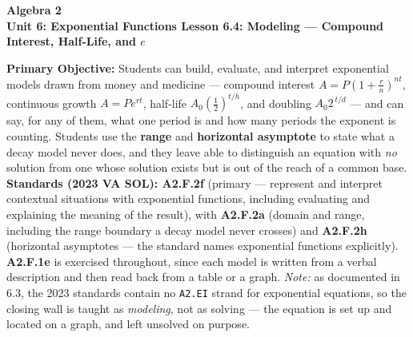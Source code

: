 \documentclass[10pt]{article}
\newcommand{\CourseName}{Algebra 2}
\newcommand{\UnitNumberName}{Unit 6: Exponential Functions \quad}
\newcommand{\LessonNumberName}{Lesson 6.4: Modeling --- Compound Interest, Half-Life, and $e$}
\begin{document}
\begin{center}
    {\Large\bfseries \CourseName \\
    {\small\bfseries \UnitNumberName \LessonNumberName}}
\end{center}

\begin{tcolorbox}[colback=forestbg, colframe=forest, boxrule=0.9pt, arc=2mm,
    left=2mm, right=2mm, top=1.5mm, bottom=1.5mm]
    \textbf{Primary Objective:} Students can build, evaluate, and interpret exponential models drawn
    from money and medicine --- compound interest $A=P\left(1+\frac{r}{n}\right)^{nt}$, continuous
    growth $A=Pe^{rt}$, half-life $A_{0}\left(\frac12\right)^{t/h}$, and doubling
    $A_{0}2^{\,t/d}$ --- and can say, for any of them, what one period is and how many periods the
    exponent is counting. Students use the \textbf{range} and \textbf{horizontal asymptote} to state
    what a decay model never does, and they leave able to distinguish an equation with \emph{no}
    solution from one whose solution exists but is out of the reach of a common base.
    \\[2pt]
    \textbf{Standards (2023 VA SOL): A2.F.2f} (primary --- represent and interpret contextual
    situations with exponential functions, including evaluating and explaining the meaning of the
    result), with \textbf{A2.F.2a} (domain and range, including the range boundary a decay model never
    crosses) and \textbf{A2.F.2h} (horizontal asymptotes --- the standard names exponential functions
    explicitly). \textbf{A2.F.1e} is exercised throughout, since each model is written from a verbal
    description and then read back from a table or a graph. \emph{Note:} as documented in 6.3, the
    2023 standards contain no \texttt{A2.EI} strand for exponential equations, so the closing wall is
    taught as \emph{modeling}, not as solving --- the equation is set up and located on a graph, and
    left unsolved on purpose.
\end{tcolorbox}
\end{document}
